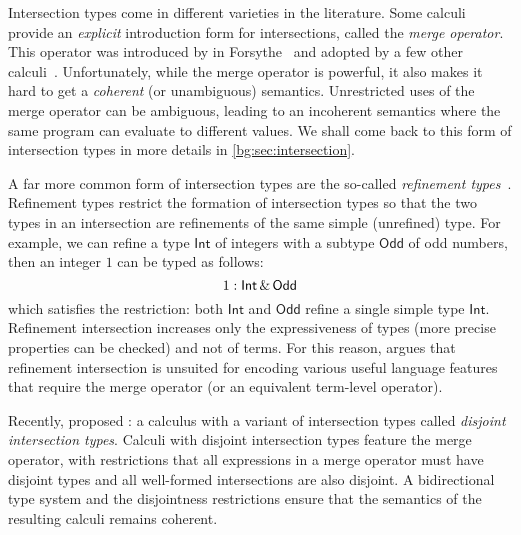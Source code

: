 Intersection types come in different varieties in the literature. Some calculi
provide an \emph{explicit} introduction form for intersections, called the
\emph{merge operator}. This operator was introduced by \citeauthor{reynolds1988preliminary} in Forsythe~\citep{reynolds1988preliminary} and
adopted by a few other calculi~\citep{Castagna_1992, dunfield2014elaborating, oliveira2016disjoint, alpuimdisjoint}. Unfortunately,
while the merge operator is powerful, it also makes it hard to get a \emph{coherent}
(or unambiguous) semantics.
Unrestricted uses of the merge operator can be ambiguous, leading to an incoherent semantics
where the same program can evaluate to different values.
We shall come back to this form of intersection types in more details in
\cref{bg:sec:intersection}.

A far more common form of intersection types are the so-called \emph{refinement
  types}~\citep{Freeman_1991, Davies_2000, dunfield2003type}. Refinement types
restrict the formation of intersection types so that the two types in an
intersection are refinements of the same simple (unrefined) type. For example,
we can refine a type $\mathsf{Int}$ of integers with a subtype $\mathsf{Odd}$ of
odd numbers, then an integer $1$ can be typed as follows:
\[
  1 : \mathsf{Int} \,\&\, \mathsf{Odd}
\]
which satisfies the restriction: both $\mathsf{Int}$ and $\mathsf{Odd}$ refine a
single simple type $\mathsf{Int}$. Refinement intersection increases only the
expressiveness of types (more precise properties can be checked) and not of
terms. For this reason, \citet{dunfield2014elaborating} argues that refinement
intersection is unsuited for encoding various useful language features that
require the merge operator (or an equivalent term-level operator).


Recently, \citet{oliveira2016disjoint} proposed \oname: a calculus with a variant of intersection types
called \emph{disjoint intersection types}.
Calculi with disjoint intersection types feature the merge
operator, with restrictions that all expressions in a merge
operator must have disjoint types and all well-formed intersections
are also disjoint. A bidirectional type system and the disjointness restrictions
ensure that the semantics of the resulting calculi remains
coherent.

